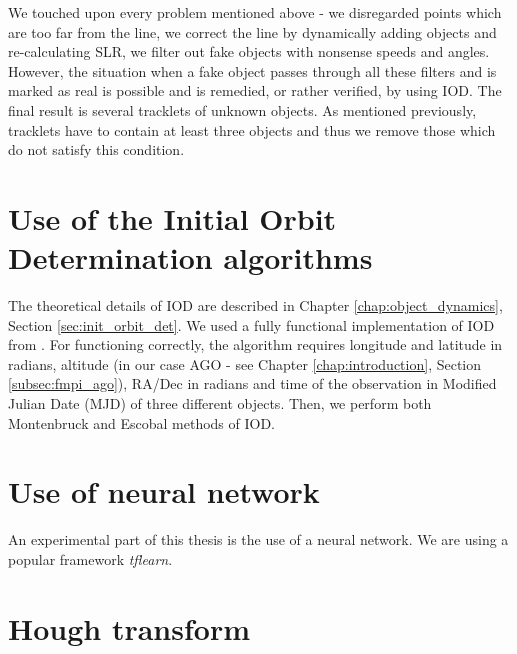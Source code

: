 	We touched upon every problem mentioned above - we disregarded points which are too far from the line, we correct the line by dynamically adding objects and re-calculating SLR, we filter out fake objects with nonsense speeds and angles. However, the situation when a fake object passes through all these filters and is marked as real is possible and is remedied, or rather verified, by using IOD. The final result is several tracklets of unknown objects. As mentioned previously, tracklets have to contain at least three objects and thus we remove those which do not satisfy this condition.

\section{Use of the Initial Orbit Determination algorithms}\label{sec:IDO}

	The theoretical details of IOD are described in Chapter \ref{chap:object_dynamics}, Section \ref{sec:init_orbit_det}. We used a fully functional implementation of IOD from \citep{Silha2012id}. For functioning correctly, the algorithm requires longitude and latitude in radians, altitude (in our case AGO - see Chapter \ref{chap:introduction}, Section \ref{subsec:fmpi_ago}), RA/Dec in radians and time of the observation in Modified Julian Date (MJD) of three different objects. Then, we perform both Montenbruck and Escobal methods of IOD.

\section{Use of neural network}\label{sec:neural}

	An experimental part of this thesis is the use of a neural network. We are using a popular framework \emph{tflearn}.

\section{Hough transform}\label{sec:hough}